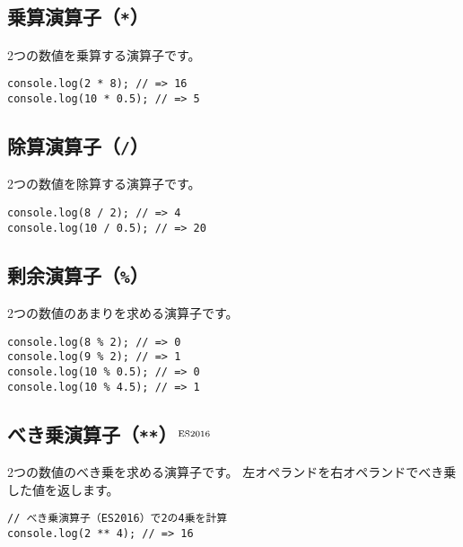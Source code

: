 \hypertarget{multiplication-operator}{%
\subsection{\texorpdfstring{乗算演算子（\texttt{*}）}{乗算演算子（*）}}\label{multiplication-operator}}

2つの数値を乗算する演算子です。

\begin{lstlisting}
console.log(2 * 8); // => 16
console.log(10 * 0.5); // => 5
\end{lstlisting}

\hypertarget{division-operator}{%
\subsection{\texorpdfstring{除算演算子（\texttt{/}）}{除算演算子（/）}}\label{division-operator}}

2つの数値を除算する演算子です。

\begin{lstlisting}
console.log(8 / 2); // => 4
console.log(10 / 0.5); // => 20
\end{lstlisting}

\hypertarget{modulus-operator}{%
\subsection{\texorpdfstring{剰余演算子（\texttt{\%}）}{剰余演算子（\%）}}\label{modulus-operator}}

2つの数値のあまりを求める演算子です。

\begin{lstlisting}
console.log(8 % 2); // => 0
console.log(9 % 2); // => 1
console.log(10 % 0.5); // => 0
console.log(10 % 4.5); // => 1
\end{lstlisting}

\hypertarget{pow-operator}{%
\subsection{べき乗演算子（\texttt{**}）{$^{\rm ES2016}$}}\label{pow-operator}}

2つの数値のべき乗を求める演算子です。
左オペランドを右オペランドでべき乗した値を返します。

\begin{lstlisting}
// べき乗演算子（ES2016）で2の4乗を計算
console.log(2 ** 4); // => 16
\end{lstlisting}

